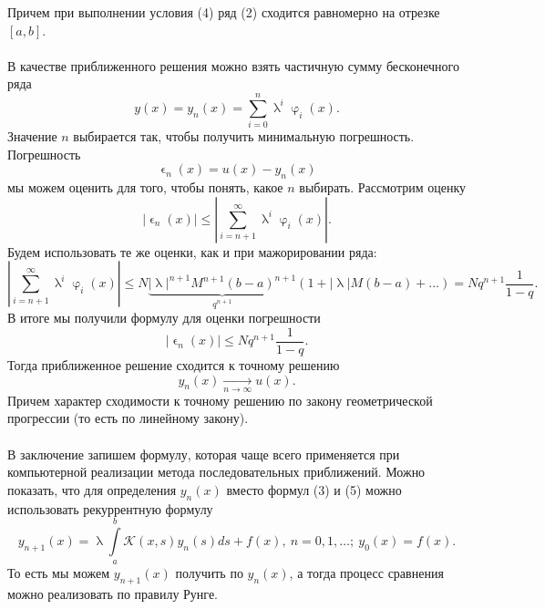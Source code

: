 \documentclass[a4paper, 12pt]{report}
\numberwithin{equation}{section}
\renewcommand{\leq}{\leqslant}
\renewcommand{\varphi}{\upvarphi}
\renewcommand{\lambda}{\uplambda}
\renewcommand{\varepsilon}{\upvarepsilon}
\begin{document}
	Причем при выполнении условия (4) ряд (2) сходится равномерно на отрезке $[a,b]$.\\\\
	В качестве приближенного решения можно взять частичную сумму бесконечного ряда
	\begin{equation}
		y(x) = y_n(x) = \sum_{i=0}^{n} \lambda^i\varphi_i(x).
	\end{equation}
	Значение $n$ выбирается так, чтобы получить минимальную погрешность. Погрешность $$\varepsilon_n(x) = u(x) - y_n(x)$$ мы можем оценить для того, чтобы понять, какое $n$ выбирать. Рассмотрим оценку $$|\varepsilon_n(x)|\leq\left| \sum_{i=n+1}^{\infty}\lambda^i \varphi_i(x)\right|.$$ 
	Будем использовать те же оценки, как и при мажорировании ряда:
	$$\left| \sum_{i=n+1}^{\infty}\lambda^i \varphi_i(x)\right|\leq N\underbrace{|\lambda|^{n+1}M^{n+1}(b-a)^{n+1}}_{q^{n+1}}\left(1 + |\lambda|M(b-a) + \ldots \right) = Nq^{n+1}\dfrac{1}{1-q}.$$
	В итоге мы получили формулу для оценки погрешности \begin{equation}
		|\varepsilon_n(x)| \leq Nq^{n+1}\dfrac{1}{1-q}.
	\end{equation}
	Тогда приближенное решение сходится к точному решению $$y_n(x)\xrightarrow[n\to\infty]{}u(x).$$
	Причем характер сходимости к точному решению по закону геометрической прогрессии (то есть по линейному закону).\\\\
	В заключение запишем формулу, которая чаще всего применяется при компьютерной реализации метода последовательных приближений. Можно показать, что для определения $y_n(x)$ вместо формул (3) и (5) можно использовать рекуррентную формулу 
	\begin{equation}
		y_{n+1}(x) = \lambda \int\limits_a^b \mathcal K(x,s) y_{n}(s)ds + f(x),\ n=0,1,\ldots;\ y_0(x) = f(x).
	\end{equation}
	То есть мы можем $y_{n+1}(x)$ получить по $y_n(x)$, а тогда процесс сравнения можно реализовать по правилу Рунге.
\end{document}
